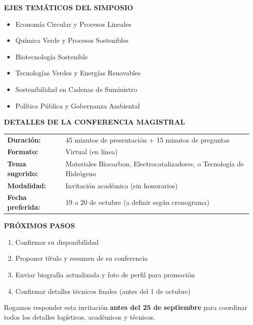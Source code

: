 \documentclass[12pt,a4paper]{article}
\begin{document}
\vspace{0.5cm}

\noindent
\textbf{EJES TEMÁTICOS DEL SIMPOSIO}

\begin{itemize}
  \item Economía Circular y Procesos Lineales
  \item Química Verde y Procesos Sostenibles
  \item Biotecnología Sostenible
  \item Tecnologías Verdes y Energías Renovables
  \item Sostenibilidad en Cadenas de Suministro
  \item Política Pública y Gobernanza Ambiental
\end{itemize}

\vspace{0.5cm}

\noindent
\textbf{DETALLES DE LA CONFERENCIA MAGISTRAL}

\begin{tabular}{ll}
\textbf{Duración:} & 45 minutos de presentación + 15 minutos de preguntas \\
\textbf{Formato:} & Virtual (en línea) \\
\textbf{Tema sugerido:} & Materiales Biocarbon, Electrocatalizadores, o Tecnología de Hidrógeno \\
\textbf{Modalidad:} & Invitación académica (sin honorarios) \\
\textbf{Fecha preferida:} & 19 o 20 de octubre (a definir según cronograma) \\
\end{tabular}

\vspace{0.5cm}

\noindent
\textbf{PRÓXIMOS PASOS}

\begin{enumerate}
  \item Confirmar su disponibilidad
  \item Proponer título y resumen de su conferencia
  \item Enviar biografía actualizada y foto de perfil para promoción
  \item Confirmar detalles técnicos finales (antes del 1 de octubre)
\end{enumerate}

\vspace{0.8cm}

Rogamos responder esta invitación \textbf{antes del 25 de septiembre} para coordinar todos los detalles logísticos, académicos y técnicos.
\end{document}
